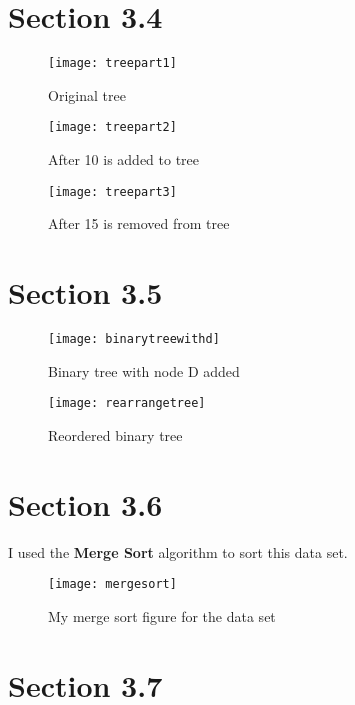 \documentclass[11pt]{article}
\begin{document}
\section*{Section 3.4}
\begin{figure}[h]
    \centering
    \texttt{[image: treepart1]}
    \caption{Original tree}
    \label{fig:my_label}
\end{figure}

\begin{figure}[h]
    \centering
    \texttt{[image: treepart2]}
    \caption{After 10 is added to tree}
    \label{fig:my_label}
\end{figure}

\begin{figure}[h]
    \centering
    \texttt{[image: treepart3]}
    \caption{After 15 is removed from tree}
    \label{fig:my_label}
\end{figure}

\section*{Section 3.5}
\begin{figure}
    \centering
    \texttt{[image: binarytreewithd]}
    \caption{Binary tree with node D added}
    \label{fig:my_label}
\end{figure}

\begin{figure}
    \centering
    \texttt{[image: rearrangetree]}
    \caption{Reordered binary tree}
    \label{fig:my_label}
\end{figure}


\section*{Section 3.6}
I used the \textbf{Merge Sort} algorithm to sort this data set.
\begin{figure}
    \centering
    \texttt{[image: mergesort]}
    \caption{My merge sort figure for the data set}
    \label{fig:my_label}
\end{figure}

\section*{Section 3.7}
\end{document}
